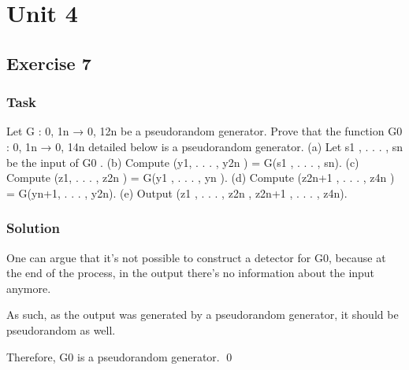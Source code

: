 \chapter{Unit 4}
\section{Exercise 7}

\subsection{Task}

Let G : {0, 1}n → {0, 1}2n be a pseudorandom generator. Prove that
the function G0 : {0, 1}n → {0, 1}4n detailed below is a pseudorandom
generator.
(a) Let s1 , . . . , sn be the input of G0 .
(b) Compute (y1, . . . , y2n ) = G(s1 , . . . , sn).
(c) Compute (z1, . . . , z2n ) = G(y1 , . . . , yn ).
(d) Compute (z2n+1 , . . . , z4n ) = G(yn+1, . . . , y2n).
(e) Output (z1 , . . . , z2n , z2n+1 , . . . , z4n).

\subsection{Solution}

One can argue that it's not possible to construct a detector for G0, because at the end of the process, in the output there's no information about the input anymore.

As such, as the output was generated by a pseudorandom generator, it should be pseudorandom as well.

Therefore, G0 is a pseudorandom generator. \qed
